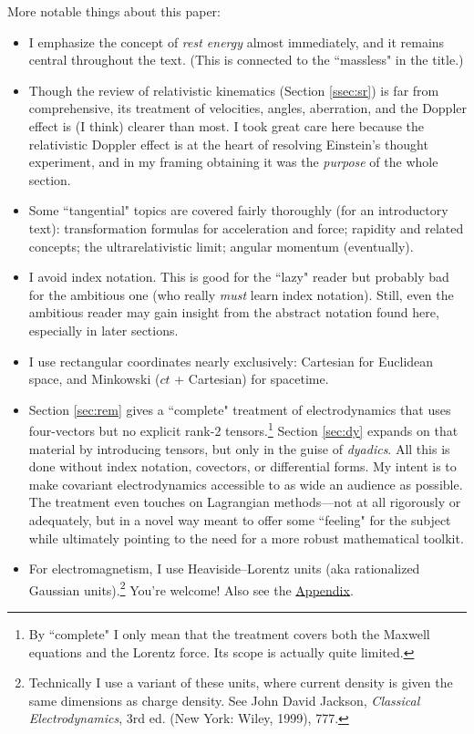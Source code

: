 \documentclass[12pt]{article}
\begin{document}
More notable things about this paper:
\begin{itemize}
\item I emphasize the concept of \emph{rest energy} almost immediately, and it remains central throughout the text. (This is connected to the ``massless" in the title.)
\item Though the review of relativistic kinematics (Section \ref{ssec:sr}) is far from comprehensive, its treatment of velocities, angles, aberration, and the Doppler effect is (I think) clearer than most. I took great care here because the relativistic Doppler effect is at the heart of resolving Einstein's thought experiment, and in my framing obtaining it was the \emph{purpose} of the whole section.
\item Some ``tangential" topics are covered fairly thoroughly (for an introductory text): transformation formulas for acceleration and force; rapidity and related concepts; the ultrarelativistic limit; angular momentum (eventually).
\item I avoid index notation. This is good for the ``lazy" reader but probably bad for the ambitious one (who really \emph{must} learn index notation). Still, even the ambitious reader may gain insight from the abstract notation found here, especially in later sections.
\item I use rectangular coordinates nearly exclusively: Cartesian for Euclidean space, and Minkowski ($ct$ + Cartesian) for spacetime.
\item Section \ref{sec:rem} gives a ``complete" treatment of electrodynamics that uses four-vectors but no explicit rank-2 tensors.\footnote{By ``complete" I only mean that the treatment covers both the Maxwell equations and the Lorentz force. Its scope is actually quite limited.} Section \ref{sec:dy} expands on that material by introducing tensors, but only in the guise of \emph{dyadics}. All this is done without index notation, covectors, or differential forms. My intent is to make covariant electrodynamics accessible to as wide an audience as possible. The treatment even touches on Lagrangian methods---not at all rigorously or adequately, but in a novel way meant to offer some ``feeling" for the subject while ultimately pointing to the need for a more robust mathematical toolkit.
\item For electromagnetism, I use Heaviside--Lorentz units (aka rationalized Gaussian units).\footnote{Technically I use a variant of these units, where current density is given the same dimensions as charge density. See John David Jackson, \emph{Classical Electrodynamics}, 3rd ed. (New York: Wiley, 1999), 777.} You're welcome! Also see the \hyperref[sec:appendix]{Appendix}.
\end{itemize}
\end{document}
